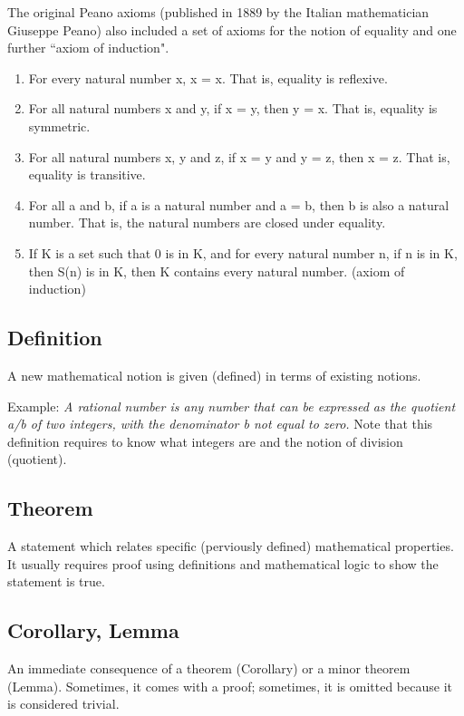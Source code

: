 \documentclass[
  a4paper,
  DIV=11,
  numbers=noendperiod,
  oneside]{scrreprt}
\theoremstyle{definition}
\theoremstyle{remark}
\begin{document}
The original Peano axioms (published in 1889 by the Italian
mathematician Giuseppe Peano) also included a set of axioms for the
notion of equality and one further ``axiom of induction".

\begin{enumerate}
\def\labelenumi{\arabic{enumi}.}
\item
  For every natural number x, x = x. That is, equality is reflexive.
\item
  For all natural numbers x and y, if x = y, then y = x. That is,
  equality is symmetric.
\item
  For all natural numbers x, y and z, if x = y and y = z, then x = z.
  That is, equality is transitive.
\item
  For all a and b, if a is a natural number and a = b, then b is also a
  natural number. That is, the natural numbers are closed under
  equality.
\item
  If K is a set such that 0 is in K, and for every natural number n, if
  n is in K, then S(n) is in K, then K contains every natural number.
  (axiom of induction)
\end{enumerate}

\subsection{Definition}\label{definition}

A new mathematical notion is given (defined) in terms of existing
notions.

Example: \emph{A rational number is any number that can be expressed as
the quotient a/b of two integers, with the denominator b not equal to
zero.} Note that this definition requires to know what integers are and
the notion of division (quotient).

\subsection{Theorem}\label{theorem}

A statement which relates specific (perviously defined) mathematical
properties. It usually requires proof using definitions and mathematical
logic to show the statement is true.

\subsection{Corollary, Lemma}\label{corollary-lemma}

An immediate consequence of a theorem (Corollary) or a minor theorem
(Lemma). Sometimes, it comes with a proof; sometimes, it is omitted
because it is considered trivial.
\end{document}
